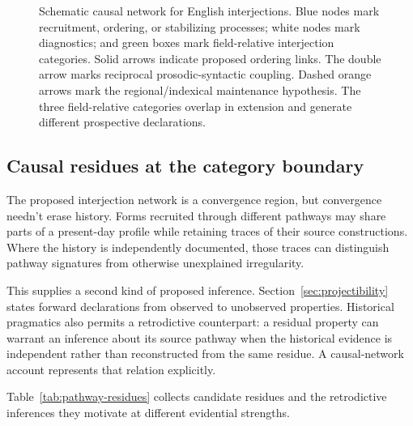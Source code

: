 \documentclass[12pt]{article}
\begin{document}
\begin{figure}[htbp]
{%
}
\caption{Schematic causal network for English interjections.
Blue nodes mark recruitment, ordering, or stabilizing processes; white
nodes mark diagnostics; and green boxes mark field-relative interjection
categories. Solid arrows indicate proposed ordering links. The double arrow
marks reciprocal prosodic-syntactic coupling. Dashed orange arrows mark
the regional/indexical maintenance hypothesis. The three field-relative
categories overlap in extension and generate different prospective
declarations.}
\label{fig:causal-network}
\end{figure}

\subsection{Causal residues at the category boundary}\label{sec:residues}

The proposed interjection network is a convergence region, but convergence
needn't erase history. Forms recruited through different pathways may share
parts of a present-day profile while retaining traces of their source
constructions. Where the history is independently documented, those traces
can distinguish pathway signatures from otherwise unexplained irregularity.

This supplies a second kind of proposed inference. Section~\ref{sec:projectibility}
states forward declarations from observed to unobserved properties.
Historical pragmatics also permits a retrodictive counterpart: a residual
property can warrant an inference about its source pathway when the historical
evidence is independent rather than reconstructed from the same residue. A
causal-network account represents that relation explicitly.

Table~\ref{tab:pathway-residues} collects candidate residues and the
retrodictive inferences they motivate at different evidential strengths.
\end{document}

